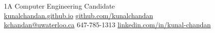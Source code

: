 \documentclass[]{chandan-cv}
\begin{document}
%
%

%
%
{ 
1A Computer Engineering Candidate \\
\href{http://kunalchandan.github.io}{kunalchandan.github.io}
\hfill
\href{http://github.com/kunalchandan}{github.com/kunalchandan}\\
\href{mailto:kchandan@uwaterloo.ca}{kchandan@uwaterloo.ca}
\hfill
647-785-1313
\hfill 
\href{https://www.linkedin.com/in/kunal-chandan/}{linkedin.com/in/kunal-chandan}
}

%
%
\end{document}

